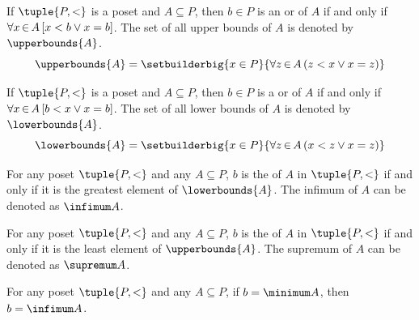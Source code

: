 \begin{dfn}
    \label{dfn:upper-bound}
    If \( \tuple{P, <} \) is a poset and \( A \subseteq P \), then \( b \in P \) is an  or  of \( A \)
    if and only if \( \forall x\,{\in}\,A \, \mleft[ x < b \lor x = b \mright] \). The set of all upper bounds of \( A \)
    is denoted by \( \upperbounds{A} \).
    \begin{equation*}
        \upperbounds{A} = \setbuilderbig{x \in P}{\forall z\,{\in}\,A \, \mleft( z < x \lor x = z \mright)}
    \end{equation*}
\end{dfn}

\begin{dfn}
    \label{dfn:lower-bound}
    If \( \tuple{P, <} \) is a poset and \( A \subseteq P \), then \( b \in P \) is a  or  of \( A \)
    if and only if \( \forall x\,{\in}\,A \, \mleft[ b < x \lor x = b \mright] \). The set of all lower bounds of \( A \) is denoted by
    \( \lowerbounds{A} \).
    \begin{equation*}
        \lowerbounds{A} = \setbuilderbig{x \in P}{\forall z\,{\in}\,A \, \mleft( x < z \lor x = z \mright)}
    \end{equation*}
\end{dfn}

\begin{dfn}[Infimum]
    \label{dfn:infimum}
    For any poset \( \tuple{P, <} \) and any \( A \subseteq P \), \( b \) is the  of \( A \) in \( \tuple{P, <} \)
    if and only if it is the greatest element of \( \lowerbounds{A} \). The infimum of \( A \) can be denoted as \( \infimum A \).
\end{dfn}

\begin{dfn}[Supremum]
    \label{dfn:supremum}
    For any poset \( \tuple{P, <} \) and any \( A \subseteq P \), \( b \) is the  of \( A \) in \( \tuple{P, <} \)
    if and only if it is the least element of \( \upperbounds{A} \). The supremum of \( A \) can be denoted as \( \supremum A \).
\end{dfn}

\begin{thm}
    \label{thm:least-element-is-the-infimum}
    For any poset \( \tuple{P, <} \) and any \( A \subseteq P \), if \( b = \minimum A \), then \( b = \infimum A \).
\end{thm}

